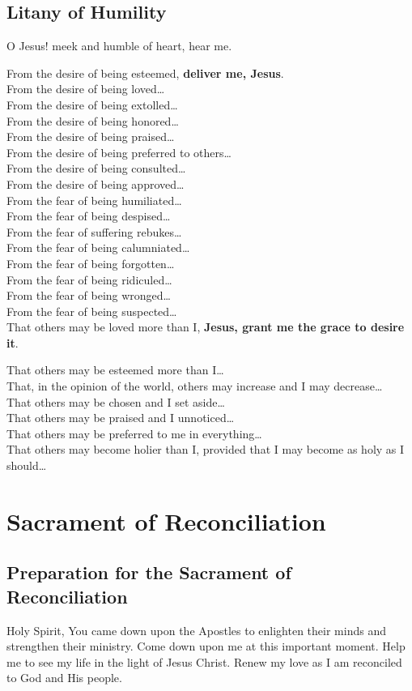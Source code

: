 \documentclass[12pt]{article}
\newcommand{\prayersection}[1]{\section{#1}}
\newcommand{\prayertitle}[1]{\subsection{#1}}
\begin{document}
\prayertitle{Litany of Humility}
\label{prayer:litany_of_humility}
O Jesus! meek and humble of heart, hear me.

From the desire of being esteemed, \textbf{deliver me, Jesus}.\\
From the desire of being loved\ldots\\
From the desire of being extolled\ldots\\
From the desire of being honored\ldots\\
From the desire of being praised\ldots\\
From the desire of being preferred to others\ldots\\
From the desire of being consulted\ldots\\
From the desire of being approved\ldots\\
From the fear of being humiliated\ldots\\
From the fear of being despised\ldots\\
From the fear of suffering rebukes\ldots\\
From the fear of being calumniated\ldots\\
From the fear of being forgotten\ldots\\
From the fear of being ridiculed\ldots\\
From the fear of being wronged\ldots\\
From the fear of being suspected\ldots\\

That others may be loved more than I, \textbf{Jesus, grant me the grace to desire it}.

That others may be esteemed more than I\ldots\\
That, in the opinion of the world, others may increase and I may decrease\ldots\\
That others may be chosen and I set aside\ldots\\
That others may be praised and I unnoticed\ldots\\
That others may be preferred to me in everything\ldots\\
That others may become holier than I, provided that I may become as holy as I should\ldots\\

\newpage

\prayersection{Sacrament of Reconciliation}
\prayertitle{Preparation for the Sacrament of Reconciliation}
Holy Spirit,
You came down upon the Apostles to enlighten their minds and strengthen their ministry.
Come down upon me at this important moment.
Help me to see my life in the light of Jesus Christ.
Renew my love as I am reconciled to God and His people.
\end{document}

